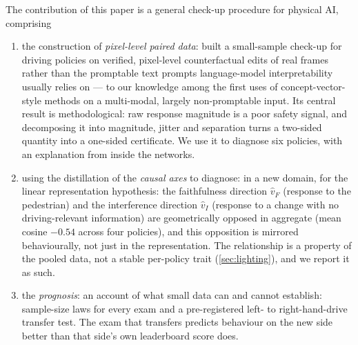 The contribution of this paper is a general check-up procedure for physical AI, comprising 
\begin{enumerate}\itemsep2pt
\item the construction of \emph{pixel-level paired data}: built a small-sample check-up for driving policies on verified, pixel-level counterfactual
      edits of real frames rather than the promptable text prompts language-model interpretability
      usually relies on --- to our knowledge among the first uses of concept-vector-style methods on
      a multi-modal, largely non-promptable input. Its central result is methodological: raw response
      magnitude is a poor safety signal, and decomposing it into magnitude, jitter and separation turns
      a two-sided quantity into a one-sided certificate. We use it to diagnose six policies, with an
      explanation from inside the networks.


\item using the distillation of the \emph{causal axes} to diagnose: in a new domain, for the linear representation hypothesis: the faithfulness direction $\hat v_F$ (response to the pedestrian) and the interference direction $\hat v_I$ (response to a
      change with no driving-relevant information) are geometrically opposed in aggregate (mean cosine $-0.54$ across
      four policies), and this opposition is mirrored behaviourally, not just in the representation.
      The relationship is a property of the pooled data, not a stable per-policy trait
      (\cref{sec:lighting}), and we report it as such.


\item the \emph{prognosis}: an account of what small data can and cannot establish: sample-size laws for every exam and a
      pre-registered left- to right-hand-drive transfer test. The exam that transfers predicts
      behaviour on the new side better than that side's own leaderboard score does.

\end{enumerate}


